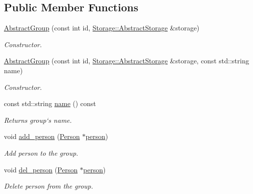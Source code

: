 \subsection*{Public Member Functions}
\begin{DoxyCompactItemize}
\item 
\hyperlink{classCore_1_1AbstractGroup_a9d5c82db4ed051f674e6a3f5586ad5e0}{AbstractGroup} (const int id, \hyperlink{classStorage_1_1AbstractStorage}{Storage::AbstractStorage} \&storage)
\begin{DoxyCompactList}\small\item\em Constructor. \item\end{DoxyCompactList}\item 
\hyperlink{classCore_1_1AbstractGroup_a2b6c9e7b2d618019fe626d28a53ddd06}{AbstractGroup} (const int id, \hyperlink{classStorage_1_1AbstractStorage}{Storage::AbstractStorage} \&storage, const std::string name)
\begin{DoxyCompactList}\small\item\em Constructor. \item\end{DoxyCompactList}\item 
const std::string \hyperlink{classCore_1_1AbstractGroup_a139cc0a6451f2dbca1f74d96f28741f0}{name} () const 
\begin{DoxyCompactList}\small\item\em Returns group`s name. \item\end{DoxyCompactList}\item 
void \hyperlink{classCore_1_1AbstractGroup_acbc75be98b4a9b9ceab55967124c0351}{add\_\-person} (\hyperlink{classCore_1_1Person}{Person} $\ast$\hyperlink{group__content_8h_ab8664e6fd42f01eeaad084b5e20eb54e}{person})
\begin{DoxyCompactList}\small\item\em Add person to the group. \item\end{DoxyCompactList}\item 
void \hyperlink{classCore_1_1AbstractGroup_a378e2ab0f4db0a47906c4341846a143b}{del\_\-person} (\hyperlink{classCore_1_1Person}{Person} $\ast$\hyperlink{group__content_8h_ab8664e6fd42f01eeaad084b5e20eb54e}{person})
\begin{DoxyCompactList}\small\item\em Delete person from the group. \item\end{DoxyCompactList}\item 

\end{DoxyCompactItemize}

